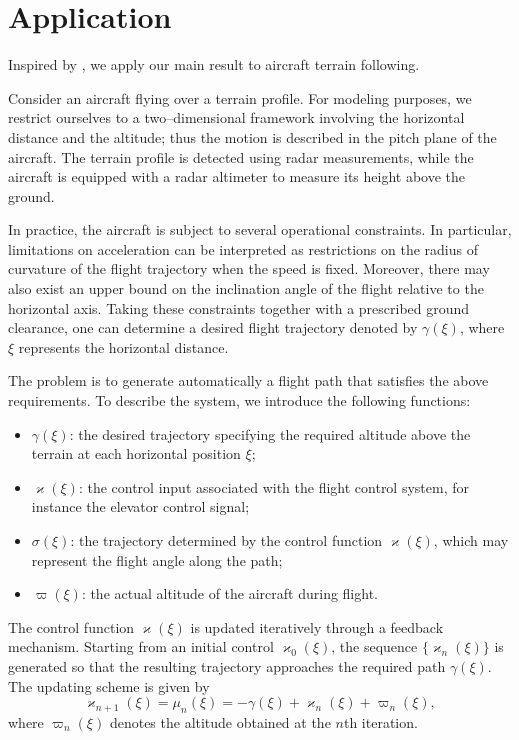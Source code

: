 \documentclass[pdflatex,sn-mathphys-num]{sn-jnl}%
\theoremstyle{thmstyleone}%
\theoremstyle{thmstyletwo}%
\theoremstyle{thmstylethree}%
\begin{document}
\section{Application}
 Inspired by \cite{ieee}, we apply our main result to aircraft terrain following.


Consider an aircraft flying over a terrain profile. For modeling purposes, we restrict ourselves to a two–dimensional framework involving the horizontal distance and the altitude; thus the motion is described in the pitch plane of the aircraft. The terrain profile is detected using radar measurements, while the aircraft is equipped with a radar altimeter to measure its height above the ground. 

In practice, the aircraft is subject to several operational constraints. In particular, limitations on acceleration can be interpreted as restrictions on the radius of curvature of the flight trajectory when the speed is fixed. Moreover, there may also exist an upper bound on the inclination angle of the flight relative to the horizontal axis. Taking these constraints together with a prescribed ground clearance, one can determine a desired flight trajectory denoted by $\gamma(\xi)$, where $\xi$ represents the horizontal distance.

The problem is to generate automatically a flight path that satisfies the above requirements. To describe the system, we introduce the following functions:

\begin{itemize}
\item $\gamma(\xi)$: the desired trajectory specifying the required altitude above the terrain at each horizontal position $\xi$;
\item $\varkappa(\xi)$: the control input associated with the flight control system, for instance the elevator control signal;
\item $\sigma(\xi)$: the trajectory determined by the control function $\varkappa(\xi)$, which may represent the flight angle along the path;
\item $\varpi(\xi)$: the actual altitude of the aircraft during flight.
\end{itemize}

The control function $\varkappa(\xi)$ is updated iteratively through a feedback mechanism. Starting from an initial control $\varkappa_0(\xi)$, the sequence $\{\varkappa_n(\xi)\}$ is generated so that the resulting trajectory approaches the required path $\gamma(\xi)$. The updating scheme is given by
\[
\varkappa_{n+1}(\xi)=\mu_n(\xi)
= -\gamma(\xi)+\varkappa_n(\xi)+\varpi_n(\xi),
\]
where $\varpi_n(\xi)$ denotes the altitude obtained at the $n$th iteration.
\end{document}
